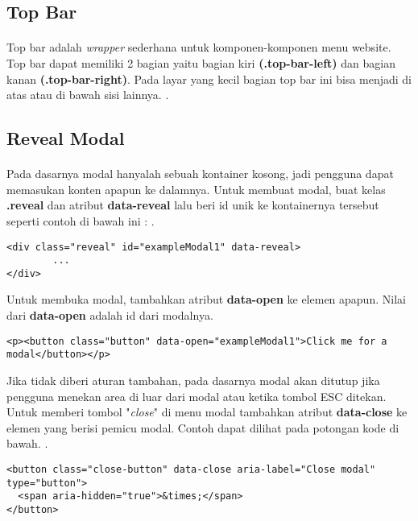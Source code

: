 \subsection{Top Bar}
\paragraph{} Top bar adalah \textit{wrapper} sederhana untuk komponen-komponen menu website. Top bar dapat memiliki 2 bagian yaitu bagian kiri \textbf{(.top-bar-left)} dan bagian kanan \textbf{(.top-bar-right)}. Pada layar yang kecil bagian top bar ini bisa menjadi di atas atau di bawah sisi lainnya. .\cite{zurbfoundation:17} 

\subsection{Reveal Modal}
\paragraph{} Pada dasarnya modal hanyalah sebuah kontainer kosong, jadi pengguna dapat memasukan konten apapun ke dalamnya. Untuk membuat modal, buat kelas \textbf{.reveal} dan atribut \textbf{data-reveal} lalu beri id unik ke kontainernya tersebut seperti contoh di bawah ini : .\cite{zurbfoundation:17} 
\begin{lstlisting}
<div class="reveal" id="exampleModal1" data-reveal>
  		...
</div>	
\end{lstlisting}
Untuk membuka modal, tambahkan atribut \textbf{data-open} ke elemen apapun. Nilai dari \textbf{data-open} adalah id dari modalnya.
\begin{lstlisting}
<p><button class="button" data-open="exampleModal1">Click me for a modal</button></p>
\end{lstlisting}
Jika tidak diberi aturan tambahan, pada dasarnya modal akan ditutup jika pengguna menekan area di luar dari modal atau ketika tombol ESC ditekan. Untuk memberi tombol "\textit{close}" di menu modal tambahkan atribut \textbf{data-close} ke elemen yang berisi pemicu modal. Contoh dapat dilihat pada potongan kode di bawah. .\cite{zurbfoundation:17} 
\begin{lstlisting}
<button class="close-button" data-close aria-label="Close modal" type="button">
  <span aria-hidden="true">&times;</span>
</button>
\end{lstlisting}

